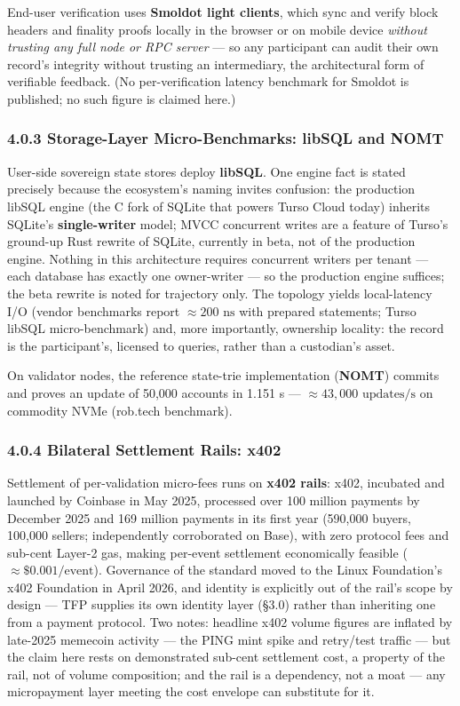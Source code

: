\documentclass[
]{article}
\begin{document}
End-user verification uses \textbf{Smoldot light clients}, which sync
and verify block headers and finality proofs locally in the browser or
on mobile device \emph{without trusting any full node or RPC server} ---
so any participant can audit their own record's integrity without
trusting an intermediary, the architectural form of verifiable feedback.
(No per-verification latency benchmark for Smoldot is published; no such
figure is claimed here.)

\subsubsection{4.0.3 Storage-Layer Micro-Benchmarks: libSQL and
NOMT}\label{storage-layer-micro-benchmarks-libsql-and-nomt}

User-side sovereign state stores deploy \textbf{libSQL}. One engine fact
is stated precisely because the ecosystem's naming invites confusion:
the production libSQL engine (the C fork of SQLite that powers Turso
Cloud today) inherits SQLite's \textbf{single-writer} model; MVCC
concurrent writes are a feature of Turso's ground-up Rust rewrite of
SQLite, currently in beta, not of the production engine. Nothing in this
architecture requires concurrent writers per tenant --- each database
has exactly one owner-writer --- so the production engine suffices; the
beta rewrite is noted for trajectory only. The topology yields
local-latency I/O (vendor benchmarks report \(\approx 200\text{ ns}\)
with prepared statements; Turso libSQL micro-benchmark) and, more
importantly, ownership locality: the record is the participant's,
licensed to queries, rather than a custodian's asset.

On validator nodes, the reference state-trie implementation
(\textbf{NOMT}) commits and proves an update of 50,000 accounts in 1.151
s --- \(\approx 43,000\text{ updates/s}\) on commodity NVMe (rob.tech
benchmark).

\subsubsection{4.0.4 Bilateral Settlement Rails:
x402}\label{bilateral-settlement-rails-x402}

Settlement of per-validation micro-fees runs on \textbf{x402 rails}:
x402, incubated and launched by Coinbase in May 2025, processed over 100
million payments by December 2025 and 169 million payments in its first
year (590,000 buyers, 100,000 sellers; independently corroborated on
Base), with zero protocol fees and sub-cent Layer-2 gas, making
per-event settlement economically feasible
(\(\approx \$0.001/\text{event}\)). Governance of the standard moved to
the Linux Foundation's x402 Foundation in April 2026, and identity is
explicitly out of the rail's scope by design --- TFP supplies its own
identity layer (§3.0) rather than inheriting one from a payment
protocol. Two notes: headline x402 volume figures are inflated by
late-2025 memecoin activity --- the PING mint spike and retry/test
traffic --- but the claim here rests on demonstrated sub-cent settlement
cost, a property of the rail, not of volume composition; and the rail is
a dependency, not a moat --- any micropayment layer meeting the cost
envelope can substitute for it.
\end{document}
